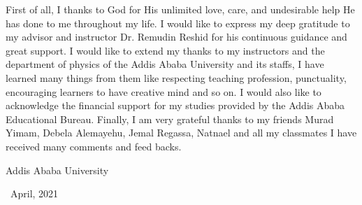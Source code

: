 \title{\thesistitle }
\author{\candidate}
\supervisor{\advisor} 
\firstexaminer{\firstreader} 
\secondexaminer{\secondreader} 



\setcounter{page}{1}



\beforepreface


First of all, I thanks to God for His unlimited love, care, and undesirable help He
has done to me throughout my life. I would like to express my deep gratitude
to my advisor and instructor Dr. Remudin Reshid for his continuous guidance and great support. I would like to extend my thanks to my instructors and the department of physics of the Addis Ababa University and its staffs, I have learned many things from them like respecting teaching profession, punctuality, encouraging learners to have creative mind and so on. I would also like to acknowledge the financial support for my studies provided by the Addis Ababa Educational
Bureau. Finally, I am very grateful thanks to my friends Murad Yimam, Debela Alemayehu, Jemal Regassa, Natnael and all my classmates I have received many comments and feed backs.

\parindent 0pt



\bigskip\medskip

\hfill Addis Ababa University \\
\medskip
\hfill \candidate \vspace{-0.2cm}

\ \hfill April, 2021














